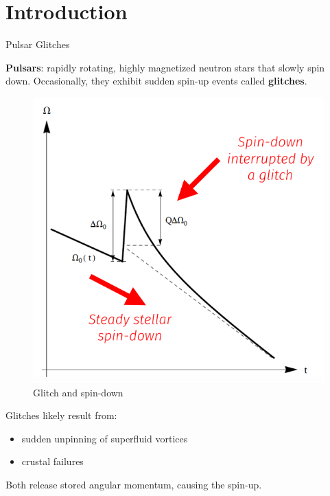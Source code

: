 \section{Introduction}


\begin{frame}{Pulsar Glitches}
	
	\begin{minipage}{0.53\textwidth}
		\textbf{Pulsars}: rapidly rotating, highly magnetized neutron stars that slowly spin down. Occasionally, they exhibit sudden spin-up events called \textbf{glitches}.
		
	\end{minipage}%
	\begin{minipage}{0.46\textwidth}
		\centering
		\vspace{1em}
		\begin{figure}
			\centering
			\includegraphics[width=0.8\linewidth]{assets/glitch.png}
			
			\vspace{-0.5em}
			
			\caption{\footnotesize Glitch and spin-down \cite{vanEysden2011}}
		\end{figure}
	\end{minipage}

	\vspace{-1em}

	Glitches likely result from:
	
		\begin{itemize}
			\item sudden unpinning of superfluid vortices
			\item crustal failures
		\end{itemize}

	Both release stored angular momentum, causing the spin-up.

\end{frame}


